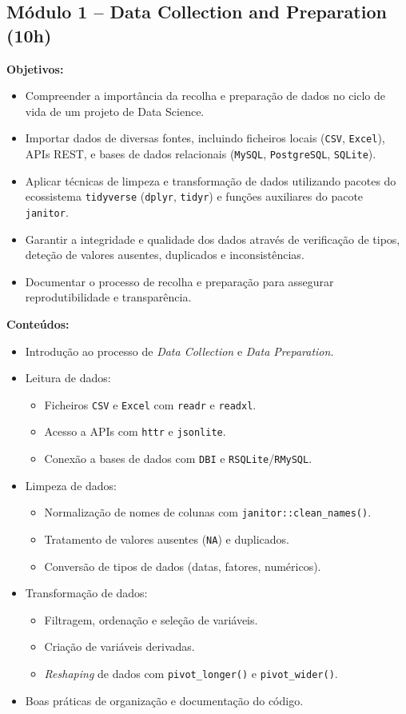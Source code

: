 \documentclass[12pt]{article}
\begin{document}
\subsection*{Módulo 1 – Data Collection and Preparation (10h)}

\textbf{Objetivos:}
\begin{itemize}
  \item Compreender a importância da recolha e preparação de dados no ciclo de vida de um projeto de Data Science.
  \item Importar dados de diversas fontes, incluindo ficheiros locais (\texttt{CSV}, \texttt{Excel}), APIs REST, e bases de dados relacionais (\texttt{MySQL}, \texttt{PostgreSQL}, \texttt{SQLite}).
  \item Aplicar técnicas de limpeza e transformação de dados utilizando pacotes do ecossistema \texttt{tidyverse} (\texttt{dplyr}, \texttt{tidyr}) e funções auxiliares do pacote \texttt{janitor}.
  \item Garantir a integridade e qualidade dos dados através de verificação de tipos, deteção de valores ausentes, duplicados e inconsistências.
  \item Documentar o processo de recolha e preparação para assegurar reprodutibilidade e transparência.
\end{itemize}

\textbf{Conteúdos:}
\begin{itemize}
  \item Introdução ao processo de \textit{Data Collection} e \textit{Data Preparation}.
  \item Leitura de dados:
    \begin{itemize}
      \item Ficheiros \texttt{CSV} e \texttt{Excel} com \texttt{readr} e \texttt{readxl}.
      \item Acesso a APIs com \texttt{httr} e \texttt{jsonlite}.
      \item Conexão a bases de dados com \texttt{DBI} e \texttt{RSQLite}/\texttt{RMySQL}.
    \end{itemize}
  \item Limpeza de dados:
    \begin{itemize}
      \item Normalização de nomes de colunas com \texttt{janitor::clean\_names()}.
      \item Tratamento de valores ausentes (\texttt{NA}) e duplicados.
      \item Conversão de tipos de dados (datas, fatores, numéricos).
    \end{itemize}
  \item Transformação de dados:
    \begin{itemize}
      \item Filtragem, ordenação e seleção de variáveis.
      \item Criação de variáveis derivadas.
      \item \textit{Reshaping} de dados com \texttt{pivot\_longer()} e \texttt{pivot\_wider()}.
    \end{itemize}
  \item Boas práticas de organização e documentação do código.
\end{itemize}
\end{document}
